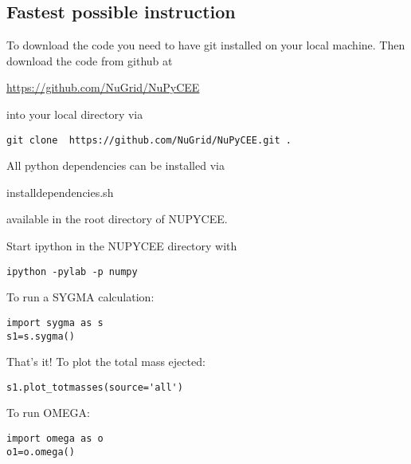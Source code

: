 
\subsection{Fastest possible instruction}

To download the code
you need to have git installed on your local machine.
Then download the code from github at

\url{https://github.com/NuGrid/NuPyCEE}

into your local directory via

\begin{verbatim}
git clone  https://github.com/NuGrid/NuPyCEE.git .
\end{verbatim}

All python dependencies can be installed via 

install\textunderscore dependencies.sh 

available in the root directory of NUPYCEE.

Start ipython in the NUPYCEE directory with

\begin{verbatim}
ipython -pylab -p numpy
\end{verbatim}

To run a SYGMA calculation:

\begin{verbatim}
import sygma as s
s1=s.sygma()
\end{verbatim}

That's it! To plot the total  mass ejected:

\begin{verbatim}
s1.plot_totmasses(source='all')	
\end{verbatim}


To run OMEGA:

\begin{verbatim}
import omega as o
o1=o.omega()
\end{verbatim}

